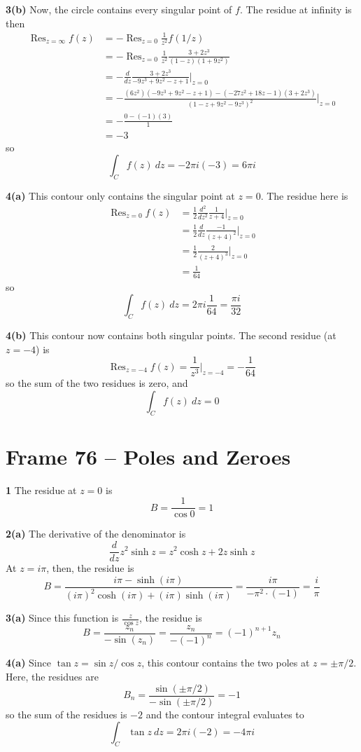 \documentclass{article}
\DeclareMathOperator{\Res}{Res}
\begin{document}
\textbf{3(b)}
Now, the circle contains every singular point of $f$. The residue at infinity is then
\begin{align*}
	\Res_{z = \infty} f(z)
	&= -\Res_{z = 0} \frac{1}{z^2} f(1/z) \\
	&= -\Res_{z = 0} \frac{1}{z^2} \frac{3 + 2z^3}{(1 - z)(1 + 9z^2)} \\
	&= -\frac{d}{dz} \frac{3 + 2z^3}{-9z^3 + 9z^2 - z + 1} \Big|_{z = 0} \\
	&= -\frac{(6z^2)(-9z^3 + 9z^2 - z + 1) - (-27z^2 + 18z - 1)(3 + 2z^3)}{(1 - z + 9z^2 - 9z^3)^2} \Big|_{z = 0} \\
	&= -\frac{0 - (-1)(3)}{1} \\
	&= -3
\end{align*}
so
\[
	\int_C f(z)~dz = -2\pi i(-3) = 6\pi i
\]

\textbf{4(a)}
This contour only contains the singular point at $z = 0$. The residue here is
\begin{align*}
	\Res_{z = 0} f(z)
	&= \frac{1}{2} \frac{d^2}{dz^2} \frac{1}{z + 4} \Big|_{z = 0} \\
	&= \frac{1}{2} \frac{d}{dz} \frac{-1}{(z + 4)^2} \Big|_{z = 0} \\
	&= \frac{1}{2} \frac{2}{(z + 4)^3} \Big|_{z = 0} \\
	&= \frac{1}{64}
\end{align*}
so
\[
	\int_C f(z)~dz = 2\pi i \frac{1}{64} = \frac{\pi i}{32}
\]

\textbf{4(b)}
This contour now contains both singular points. The second residue (at $z = -4$) is
\[
	\Res_{z = -4} f(z)
	= \frac{1}{z^3} \Big|_{z = -4}
	= -\frac{1}{64}
\]
so the sum of the two residues is zero, and
\[
	\int_C f(z)~dz = 0
\]


\clearpage
\section{Frame 76 -- Poles and Zeroes}
\textbf{1}
The residue at $z = 0$ is
\[
	B = \frac{1}{\cos 0} = 1
\]

\textbf{2(a)}
The derivative of the denominator is
\[
	\frac{d}{dz} z^2 \sinh z
	= z^2 \cosh z + 2z \sinh z
\]
At $z = i\pi$, then, the residue is
\[
	B
	= \frac{i \pi - \sinh(i \pi)}{(i\pi)^2 \cosh(i\pi) + (i\pi) \sinh(i\pi)}
	= \frac{i \pi}{ -\pi^2 \cdot (-1)}
	= \frac{i}{\pi}
\]

\textbf{3(a)}
Since this function is $\frac{z}{\cos z}$, the residue is
\[
	B 
	= \frac{z_n}{-\sin(z_n)}
	= \frac{z_n}{-(-1)^n}
	= (-1)^{n+1} z_n
\]

\textbf{4(a)}
Since $\tan z = \sin z / \cos z$, this contour contains the two poles at $z = \pm \pi/2$. Here, the residues are
\[
	B_n
	= \frac{\sin(\pm \pi/2)}{-\sin(\pm \pi/2)}
	= -1
\]
so the sum of the residues is $-2$ and the contour integral evaluates to
\[
	\int_C \tan z~dz = 2\pi i(-2) = -4\pi i
\]
\end{document}
